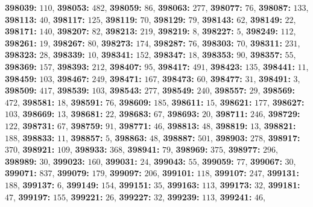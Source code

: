 \textsf{\bfseries 398039:} $110$, \textsf{\bfseries 398053:} $482$, \textsf{\bfseries 398059:} $86$, \textsf{\bfseries 398063:} $277$, \textsf{\bfseries 398077:} $76$, \textsf{\bfseries 398087:} $133$, \textsf{\bfseries 398113:} $40$, \textsf{\bfseries 398117:} $125$, \textsf{\bfseries 398119:} $70$, \textsf{\bfseries 398129:} $79$, \textsf{\bfseries 398143:} $62$, \textsf{\bfseries 398149:} $22$, \textsf{\bfseries 398171:} $140$, \textsf{\bfseries 398207:} $82$, \textsf{\bfseries 398213:} $219$, \textsf{\bfseries 398219:} $8$, \textsf{\bfseries 398227:} $5$, \textsf{\bfseries 398249:} $112$, \textsf{\bfseries 398261:} $19$, \textsf{\bfseries 398267:} $80$, \textsf{\bfseries 398273:} $174$, \textsf{\bfseries 398287:} $76$, \textsf{\bfseries 398303:} $70$, \textsf{\bfseries 398311:} $231$, \textsf{\bfseries 398323:} $28$, \textsf{\bfseries 398339:} $10$, \textsf{\bfseries 398341:} $152$, \textsf{\bfseries 398347:} $18$, \textsf{\bfseries 398353:} $90$, \textsf{\bfseries 398357:} $55$, \textsf{\bfseries 398369:} $157$, \textsf{\bfseries 398393:} $212$, \textsf{\bfseries 398407:} $95$, \textsf{\bfseries 398417:} $491$, \textsf{\bfseries 398423:} $135$, \textsf{\bfseries 398441:} $11$, \textsf{\bfseries 398459:} $103$, \textsf{\bfseries 398467:} $249$, \textsf{\bfseries 398471:} $167$, \textsf{\bfseries 398473:} $60$, \textsf{\bfseries 398477:} $31$, \textsf{\bfseries 398491:} $3$, \textsf{\bfseries 398509:} $417$, \textsf{\bfseries 398539:} $103$, \textsf{\bfseries 398543:} $277$, \textsf{\bfseries 398549:} $240$, \textsf{\bfseries 398557:} $29$, \textsf{\bfseries 398569:} $472$, \textsf{\bfseries 398581:} $18$, \textsf{\bfseries 398591:} $76$, \textsf{\bfseries 398609:} $185$, \textsf{\bfseries 398611:} $15$, \textsf{\bfseries 398621:} $177$, \textsf{\bfseries 398627:} $103$, \textsf{\bfseries 398669:} $13$, \textsf{\bfseries 398681:} $22$, \textsf{\bfseries 398683:} $67$, \textsf{\bfseries 398693:} $20$, \textsf{\bfseries 398711:} $246$, \textsf{\bfseries 398729:} $122$, \textsf{\bfseries 398731:} $67$, \textsf{\bfseries 398759:} $91$, \textsf{\bfseries 398771:} $46$, \textsf{\bfseries 398813:} $48$, \textsf{\bfseries 398819:} $13$, \textsf{\bfseries 398821:} $188$, \textsf{\bfseries 398833:} $11$, \textsf{\bfseries 398857:} $5$, \textsf{\bfseries 398863:} $48$, \textsf{\bfseries 398887:} $501$, \textsf{\bfseries 398903:} $278$, \textsf{\bfseries 398917:} $370$, \textsf{\bfseries 398921:} $109$, \textsf{\bfseries 398933:} $368$, \textsf{\bfseries 398941:} $79$, \textsf{\bfseries 398969:} $375$, \textsf{\bfseries 398977:} $296$, \textsf{\bfseries 398989:} $30$, \textsf{\bfseries 399023:} $160$, \textsf{\bfseries 399031:} $24$, \textsf{\bfseries 399043:} $55$, \textsf{\bfseries 399059:} $77$, \textsf{\bfseries 399067:} $30$, \textsf{\bfseries 399071:} $837$, \textsf{\bfseries 399079:} $179$, \textsf{\bfseries 399097:} $206$, \textsf{\bfseries 399101:} $118$, \textsf{\bfseries 399107:} $247$, \textsf{\bfseries 399131:} $188$, \textsf{\bfseries 399137:} $6$, \textsf{\bfseries 399149:} $154$, \textsf{\bfseries 399151:} $35$, \textsf{\bfseries 399163:} $113$, \textsf{\bfseries 399173:} $32$, \textsf{\bfseries 399181:} $47$, \textsf{\bfseries 399197:} $155$, \textsf{\bfseries 399221:} $26$, \textsf{\bfseries 399227:} $32$, \textsf{\bfseries 399239:} $113$, \textsf{\bfseries 399241:} $46$, 
